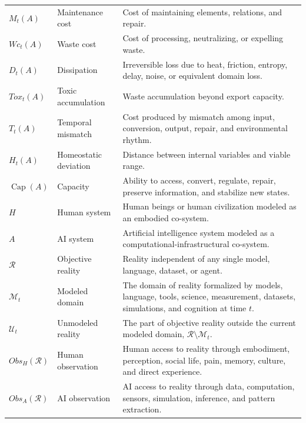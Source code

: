 \documentclass[11pt,a4paper]{article}
\newcommand{\Capacity}{\operatorname{Cap}}
\begin{document}
\begin{longtable}{p{}p{}p{}}
$M_t(A)$ & Maintenance cost & Cost of maintaining elements, relations, and repair. \\

$Wc_t(A)$ & Waste cost & Cost of processing, neutralizing, or expelling waste. \\

$D_t(A)$ & Dissipation & Irreversible loss due to heat, friction, entropy, delay, noise, or equivalent domain loss. \\

$Tox_t(A)$ & Toxic accumulation & Waste accumulation beyond export capacity. \\

$T_t(A)$ & Temporal mismatch & Cost produced by mismatch among input, conversion, output, repair, and environmental rhythm. \\

$H_t(A)$ & Homeostatic deviation & Distance between internal variables and viable range. \\

$\Capacity(A)$ & Capacity & Ability to access, convert, regulate, repair, preserve information, and stabilize new states. \\

$H$ & Human system & Human beings or human civilization modeled as an embodied co-system. \\

$A$ & AI system & Artificial intelligence system modeled as a computational-infrastructural co-system. \\

$\mathcal{R}$ & Objective reality & Reality independent of any single model, language, dataset, or agent. \\

$\mathcal{M}_t$ & Modeled domain & The domain of reality formalized by models, language, tools, science, measurement, datasets, simulations, and cognition at time $t$. \\

$\mathcal{U}_t$ & Unmodeled reality & The part of objective reality outside the current modeled domain, $\mathcal{R}\setminus\mathcal{M}_t$. \\

$Obs_H(\mathcal{R})$ & Human observation & Human access to reality through embodiment, perception, social life, pain, memory, culture, and direct experience. \\

$Obs_A(\mathcal{R})$ & AI observation & AI access to reality through data, computation, sensors, simulation, inference, and pattern extraction. \\


\end{longtable}
\end{document}
